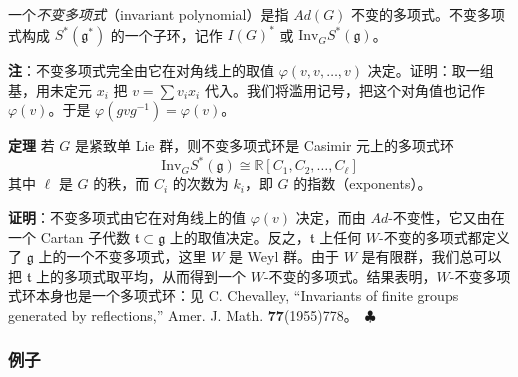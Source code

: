 
一个\emph{不变多项式}（invariant polynomial）是指 $Ad(G)$ 不变的多项式。不变多项式构成 $S^*(\mathfrak{g}^*)$ 的一个子环，记作 $I(G)^*$ 或 $\mathrm{Inv}_G S^*(\mathfrak{g})$。

\textbf{注}：不变多项式完全由它在对角线上的取值 $\varphi(v,v,\dots,v)$ 决定。证明：取一组基，用未定元 $x_i$ 把 $v=\sum v_ix_i$ 代入。我们将滥用记号，把这个对角值也记作 $\varphi(v)$。于是 $\varphi(gvg^{-1})=\varphi(v)$。

\textbf{定理} 若 $G$ 是紧致单 Lie 群，则不变多项式环是 Casimir 元上的多项式环
\begin{equation}
  \mathrm{Inv}_G S^*(\mathfrak{g}) \cong \mathbb{R}[C_1,C_2,\dots,C_\ell]
  \tag{I.6}
  \label{eq:I.6}
\end{equation}
其中 $\ell$ 是 $G$ 的秩，而 $C_i$ 的次数为 $k_i$，即 $G$ 的指数（exponents）。

\textbf{证明}：不变多项式由它在对角线上的值 $\varphi(v)$ 决定，而由 $Ad$-不变性，它又由在一个 Cartan 子代数 $\mathfrak{t}\subset\mathfrak{g}$ 上的取值决定。反之，$\mathfrak{t}$ 上任何 $W$-不变的多项式都定义了 $\mathfrak{g}$ 上的一个不变多项式，这里 $W$ 是 Weyl 群。由于 $W$ 是有限群，我们总可以把 $\mathfrak{t}$ 上的多项式取平均，从而得到一个 $W$-不变的多项式。结果表明，$W$-不变多项式环本身也是一个多项式环：见 C. Chevalley, ``Invariants of finite groups generated by reflections,'' Amer. J. Math. \textbf{77}(1955)778。\ $\clubsuit$


\subsubsection{例子} %


